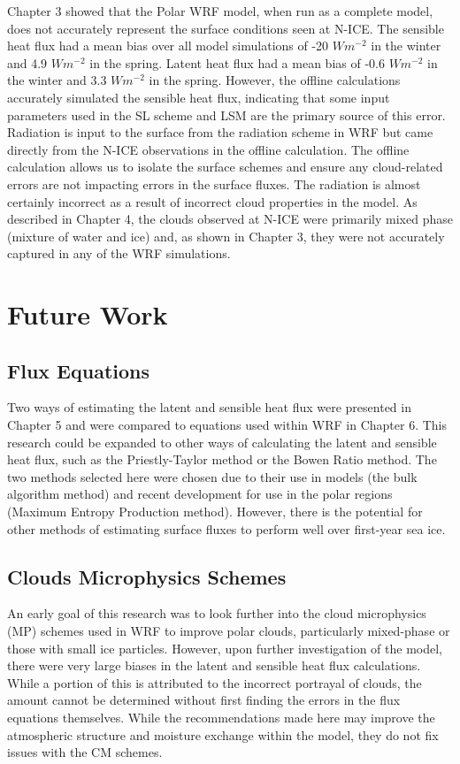 Chapter 3 showed that the Polar WRF model, when run as a complete model, does not accurately represent the surface conditions seen at N-ICE. The sensible heat flux had a mean bias over all model simulations of -20 $Wm^{-2}$ in the winter and 4.9 $Wm^{-2}$ in the spring. Latent heat flux had a mean bias of -0.6 $Wm^{-2}$ in the winter and 3.3 $Wm^{-2}$ in the spring. However, the offline calculations accurately simulated the sensible heat flux, indicating that some input parameters used in the SL scheme and LSM are the primary source of this error. Radiation is input to the surface from the radiation scheme in WRF but came directly from the N-ICE observations in the offline calculation. The offline calculation allows us to isolate the surface schemes and ensure any cloud-related errors are not impacting errors in the surface fluxes. The radiation is almost certainly incorrect as a result of incorrect cloud properties in the model. As described in Chapter 4, the clouds observed at N-ICE were primarily mixed phase (mixture of water and ice) and, as shown in Chapter 3, they were not accurately captured in any of the WRF simulations. 

\section{Future Work}
\subsection{Flux Equations}
Two ways of estimating the latent and sensible heat flux were presented in Chapter 5 and were compared to equations used within WRF in Chapter 6. This research could be expanded to other ways of calculating the latent and sensible heat flux, such as the Priestly-Taylor method or the Bowen Ratio method. The two methods selected here were chosen due to their use in models (the bulk algorithm method) and recent development for use in the polar regions (Maximum Entropy Production method). However, there is the potential for other methods of estimating surface fluxes to perform well over first-year sea ice.

\subsection{Clouds Microphysics Schemes}
An early goal of this research was to look further into the cloud microphysics (MP) schemes used in WRF to improve polar clouds, particularly mixed-phase or those with small ice particles. However, upon further investigation of the model, there were very large biases in the latent and sensible heat flux calculations. While a portion of this is attributed to the incorrect portrayal of clouds, the amount cannot be determined without first finding the errors in the flux equations themselves. While the recommendations made here may improve the atmospheric structure and moisture exchange within the model, they do not fix issues with the CM schemes. 

